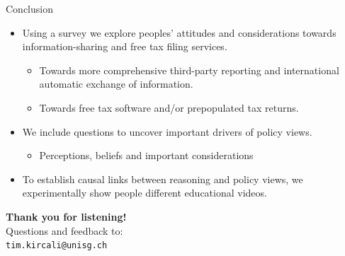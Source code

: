 \documentclass{beamer}
\begin{document}
\begin{frame}{Conclusion}
\begin{itemize}
\item Using a survey \alert{we explore peoples' attitudes and considerations towards information-sharing and free tax filing services.} 
\begin{itemize}
\item Towards more comprehensive third-party reporting and international automatic exchange of information.
\item Towards free tax software and/or prepopulated tax returns.
\end{itemize}
\vspace{0.5em}
\item We include questions to \alert{uncover important drivers of policy views.}
\begin{itemize}
    \item Perceptions, beliefs and important considerations 
\end{itemize}
\vspace{0.5em}
\item To \alert{establish causal links} between reasoning and policy views, we \alert{experimentally show} people different educational \alert{videos}.
\end{itemize}
\end{frame}

\begin{frame}
\centering
\vfill

{\Huge \textbf{Thank you for listening!}} \\[1.5em]

{\Large Questions and feedback to:} \\[0.5em]
\texttt{tim.kircali@unisg.ch}

\vfill
\end{frame}

\appendix
\end{document}
